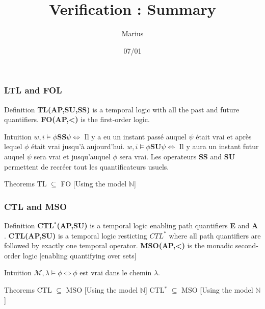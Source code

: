 \documentclass[pdf]{beamer}
\title{Verification : Summary}
\author{Marius}
\date{07/01}
\newcommand{\N}{\ensuremath{\mathbb{N}}}
\newcommand{\M}{\mathcal{M}}
\begin{document}
\maketitle
\begin{frame}
\frametitle{LTL and FOL}

\begin{block}{Definition}
\textbf{TL(AP,SU,SS)} is a temporal logic with all the past and future quantifiers.\newline
\textbf{FO(AP,<)} is the first-order logic.
\end{block}


\begin{exampleblock}{Intuition}
$w,i \models \phi \mathbf{SS}\psi \Leftrightarrow $ Il y a eu un instant passé auquel $\psi$ était vrai et après lequel $\phi$ était vrai jusqu'à aujourd'hui.\newline
$w,i \models \phi \mathbf{SU} \psi \Leftrightarrow $ Il y aura un instant futur auquel $\psi$ sera vrai et jusqu'auquel $\phi$ sera vrai.\newline
Les operateurs \textbf{SS} and \textbf{SU} permettent de recréer tout les quantificateurs usuels.
\end{exampleblock}


\begin{alertblock}{Theorems}
TL $\subseteq$ FO [Using the model $\N$]\newline
\end{alertblock}

\end{frame}

\begin{frame}
\frametitle{CTL and MSO}

\begin{block}{Definition}
\textbf{CTL$^*$(AP,SU)} is a temporal logic enabling path quantifiers \textbf{E} and \textbf{A} .\newline
\textbf{CTL(AP,SU)} is a temporal logic resticting $CTL^*$ where all path quantifiers are followed by exactly one temporal operator.\newline
\textbf{MSO(AP,<)} is the monadic second-order logic [enabling quantifying over sets]
\end{block}


\begin{exampleblock}{Intuition}
$\M,\lambda \models \phi  \Leftrightarrow \phi$ est vrai dans le chemin $\lambda$.
\end{exampleblock}


\begin{alertblock}{Theorems}
CTL $\subseteq$ MSO [Using the model $\N$]\newline
CTL$^*$ $\subseteq$ MSO [Using the model $\N$]\newline
\end{alertblock}

\end{frame}
\end{document}
